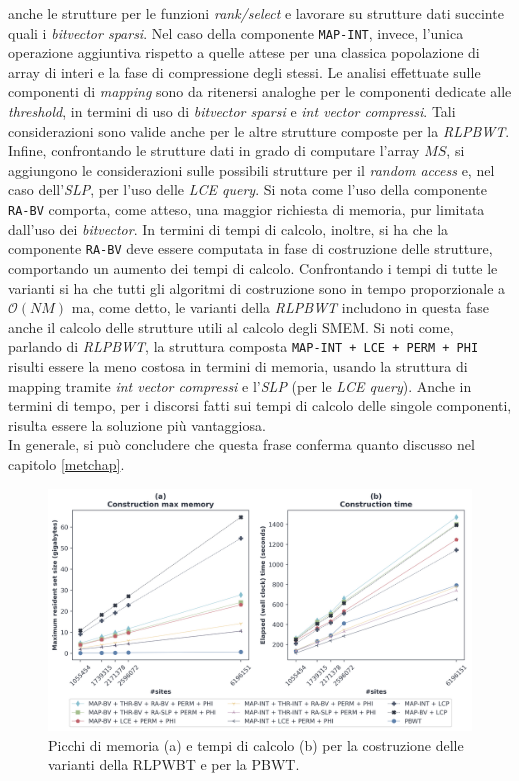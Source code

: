 anche le strutture per le funzioni \textit{rank/select} e lavorare su strutture
dati succinte quali i \textit{bitvector sparsi}. Nel caso della componente
\texttt{MAP-INT}, invece, l'unica operazione aggiuntiva rispetto a quelle attese
per una classica popolazione di array di interi e la fase di compressione degli
stessi. Le analisi effettuate sulle componenti di \textit{mapping} sono da
ritenersi analoghe per le componenti dedicate alle \textit{threshold}, in
termini di uso di \textit{bitvector sparsi} e \textit{int vector
  compressi}. Tali considerazioni sono valide anche per le altre strutture
composte per la \textit{RLPBWT}. Infine, confrontando le strutture dati in grado
di computare l'array $MS$, si aggiungono le considerazioni sulle possibili
strutture per il \textit{random access} e, nel caso dell'\textit{SLP}, per l'uso
delle \textit{LCE query}. Si nota come l'uso della componente \texttt{RA-BV}
comporta, come atteso, una maggior richiesta di memoria, pur limitata dall'uso
dei \textit{bitvector}. In termini di tempi di calcolo, inoltre, si ha che la
componente \texttt{RA-BV} deve essere computata in fase di costruzione delle
strutture, comportando un aumento dei tempi di calcolo. Confrontando i tempi di
tutte le varianti si ha che tutti gli algoritmi di costruzione sono in tempo
proporzionale a $\mathcal{O}(NM)$ ma, come detto, le varianti della
\textit{RLPBWT} includono  in questa fase anche il calcolo delle strutture utili
al calcolo degli SMEM. Si noti come, parlando di \textit{RLPBWT}, la struttura
composta \texttt{MAP-INT + LCE + PERM + PHI} risulti essere la meno costosa in
termini di memoria, usando la struttura di mapping tramite \textit{int vector
  compressi} e l'\textit{SLP} (per le \textit{LCE query}). Anche in termini di
tempo, per i discorsi fatti sui tempi di calcolo delle singole componenti,
risulta essere la soluzione più vantaggiosa.\\
In generale, si può 
concludere che questa frase conferma quanto discusso nel capitolo
\ref{metchap}.\\ 
\begin{figure}
  \centering
  \includegraphics[width=\linewidth]{img/make_time_mem_paper.png}
  \caption{Picchi di memoria (a) e tempi di calcolo (b) per la
    costruzione delle varianti della RLPWBT e per 
    la PBWT.}
  \label{fig:maketimememchr}
\end{figure}
